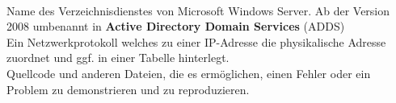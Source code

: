 \thispagestyle{empty}
\begin{acronym}
	\\
	Name des Verzeichnisdienstes von Microsoft Windows Server. Ab der Version 2008 umbenannt in \textbf{Active Directory Domain Services} (ADDS)
	\\
	Ein Netzwerkprotokoll welches zu einer IP-Adresse die physikalische Adresse zuordnet und ggf. in einer Tabelle hinterlegt.
	\\
	Quellcode und anderen Dateien, die es ermöglichen, einen Fehler oder ein Problem zu demonstrieren und zu reproduzieren.
\end{acronym}
